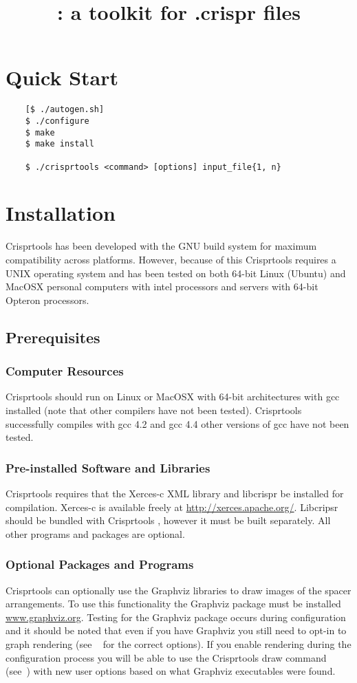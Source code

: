 \documentclass[11pt]{article} %
\title{\programname: a toolkit for .crispr files}
\author{\authorname}
\newcommand{\programname}{Crisprtools }
\begin{document}
\maketitle
\tableofcontents
\section{Quick Start}
\begin{lstlisting}
	[$ ./autogen.sh]
	$ ./configure
	$ make
	$ make install
	
	$ ./crisprtools <command> [options] input_file{1, n}
\end{lstlisting}
\section{Installation}
\programname has been developed with the GNU build system for maximum compatibility across platforms.  However, because of this \programname requires a UNIX operating system and has been tested on both 64-bit Linux (Ubuntu) and MacOSX personal computers with intel processors and servers with 64-bit Opteron processors.
\subsection{Prerequisites}
\subsubsection{Computer Resources}
\programname should run on Linux or MacOSX with 64-bit architectures with gcc installed (note that other compilers have not been tested).  \programname successfully compiles with gcc 4.2 and gcc 4.4 other versions of gcc have not been tested.    

\subsubsection{Pre-installed Software and Libraries}
\programname requires that the Xerces-c XML library and libcrispr be installed for compilation.  Xerces-c is available freely at \url{http://xerces.apache.org/}.  Libcripsr should be bundled with \programname, however it must be built separately. All other programs and packages are optional.
\subsubsection{Optional Packages and Programs}
\programname can optionally use the Graphviz libraries to draw images of the spacer arrangements.  To use this functionality  the Graphviz package must be installed \url{www.graphviz.org}.  Testing for the Graphviz package occurs during configuration and it should be noted that even if you have Graphviz you still need to opt-in to graph rendering (see  ~ for the correct options).  If you enable rendering during the configuration process you will be able to use the \programname draw command (see~) with new user options based on what Graphviz executables were found.
\end{document}
